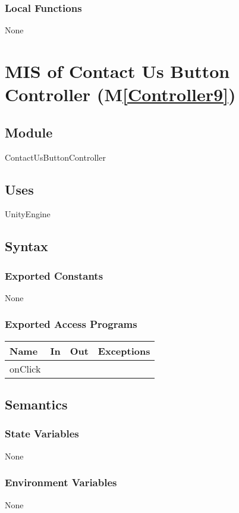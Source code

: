 \documentclass[12pt, titlepage]{article}
\newcommand{\mref}[1]{M\ref{#1}}
\begin{document}
\subsubsection{Local Functions}
None
\newpage

\section{MIS of Contact Us Button Controller (\mref{Controller9})} 

\subsection{Module}
ContactUsButtonController
\subsection{Uses}
UnityEngine
\subsection{Syntax}

\subsubsection{Exported Constants}
None

\subsubsection{Exported Access Programs}
\begin{center}
\begin{tabular}{|p{6cm}|p{3cm}|p{3cm}| p{4cm}|}
\hline
\textbf{Name} & \textbf{In} & \textbf{Out} & \textbf{Exceptions} \\
\hline
 onClick & & &\\
\hline
\end{tabular}
\end{center}

\subsection{Semantics}
\subsubsection{State Variables}
None

\subsubsection{Environment Variables}
None
\end{document}
